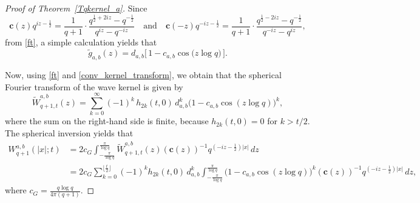 \documentclass[12pt]{amsart}
\numberwithin{equation}{section}
\theoremstyle{boldremark}
\begin{document}
\begin{proof}[Proof of Theorem~\ref{Tqkernel_a}]
Since
\begin{equation*}
\boldsymbol{c}(z) q^{iz -\frac{1}{2}}=\frac{1}{q+1} \cdot \frac{q^{\frac{1}{2}+2iz}-q^{-\frac{1}{2}}}{q^{iz}-q^{-iz}} \quad \text{and}  \quad \boldsymbol{c}(-z) q^{-iz -\frac{1}{2}}=\frac{1}{q+1} \cdot \frac{q^{\frac{1}{2}-2iz}-q^{-\frac{1}{2}}}{q^{-iz}-q^{iz}},
\end{equation*}
from \eqref{ft}, a simple calculation yields that
\begin{equation} \label{conv_kernel_transform}
\tilde{g}_{a,b}\left(z\right)=d_{a,b}\Big[\,1- c_{a,b}\cos\!\big(z\log{q}\big)\,\Big].
\end{equation}

Now, using \eqref{ft} and \eqref{conv_kernel_transform}, we obtain that the spherical Fourier transform of the wave kernel is given by
\begin{equation*}%
\tilde{W}^{a,b}_{q+1,t}\left(z\right)
= \sum_{k=0}^{\infty}(-1)^k \, h_{2k}(t,0)\, d_{a,b}^k\big(1- c_{a,b}\cos(z\log q)\big)^{k},
\end{equation*}
where the sum on the right-hand side is finite, because $h_{2k}(t,0)=0$ for $k>t/2$. The spherical inversion yields that
\begin{equation}\label{inverse1}
    \begin{split}
W^{a,b}_{q+1}\left(|x|;t\right)&=2c_G \int_{-\frac{\pi}{\log{q}}}^{\frac{\pi}{\log{q}}} \tilde{W}^{a,b}_{q+1,t}\left(z\right) \left(\boldsymbol{c}(z)\right)^{-1} q^{(-iz - \frac{1}{2})|x|} \,dz \\
&=2c_G\sum_{k=0}^{\lfloor \frac{t}{2} \rfloor} (-1)^k h_{2k}\left(t,0\right)\,d_{a,b}^k
\int_{-\frac{\pi}{\log{q}}}^{\frac{\pi}{\log{q}}}\!\Big(1- c_{a,b}\cos(z\log q)\Big)^{k} \left(\boldsymbol{c}(z)\right)^{-1}  q^{(-iz - \frac{1}{2})|x|} \,dz ,
    \end{split}
\end{equation}
where $c_G=\frac{q\log{q}}{4\pi(q+1)}$.


\end{proof}
\end{document}

